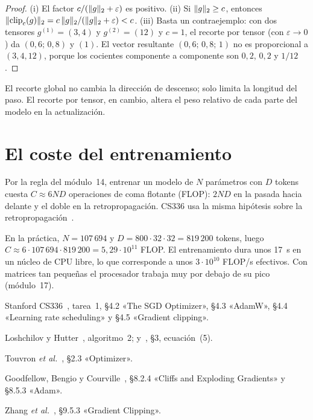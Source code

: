 \begin{proof}
(i) El factor $c/(\lVert g\rVert_2+\varepsilon)$ es positivo. (ii) Si $\lVert g\rVert_2\ge c$, entonces $\lVert\operatorname{clip}_c(g)\rVert_2=c\,\lVert g\rVert_2/(\lVert g\rVert_2+\varepsilon)<c$. (iii) Basta un contraejemplo: con dos tensores $g^{(1)}=(3,4)$ y $g^{(2)}=(12)$ y $c=1$, el recorte por tensor (con $\varepsilon\to 0$) da $(0{,}6;\allowbreak\,0{,}8)$ y $(1)$. El vector resultante $(0{,}6;\allowbreak\,0{,}8;\allowbreak\,1)$ no es proporcional a $(3,4,12)$, porque los cocientes componente a componente son $0{,}2$, $0{,}2$ y $1/12$.
\end{proof}

El recorte global no cambia la dirección de descenso; solo limita la longitud del paso. El recorte por tensor, en cambio, altera el peso relativo de cada parte del modelo en la actualización.

\section{El coste del entrenamiento}

Por la regla del módulo~14, entrenar un modelo de $N$ parámetros con $D$ tokens cuesta $C\approx 6ND$ operaciones de coma flotante (FLOP): $2ND$ en la pasada hacia delante y el doble en la retropropagación. CS336 usa la misma hipótesis sobre la retropropagación~\cite[§4.3, problema \emph{adamw\_accounting}]{cs336}.

\begin{ejemplo}\label{ej:coste}
En la práctica, $N=107\,694$ y $D=800\cdot 32\cdot 32=819\,200$ tokens, luego $C\approx 6\cdot 107\,694\cdot 819\,200=5{,}29\cdot 10^{11}$ FLOP. El entrenamiento dura unos 17~s en un núcleo de CPU libre, lo que corresponde a unos $3\cdot 10^{10}$ FLOP/s efectivos. Con matrices tan pequeñas el procesador trabaja muy por debajo de su pico (módulo~17).
\end{ejemplo}

\begin{lecturas}
\item Stanford CS336~\cite{cs336}, tarea~1, §4.2 «The SGD Optimizer», §4.3 «AdamW», §4.4 «Learning rate scheduling» y §4.5 «Gradient clipping».
\item Loshchilov y Hutter~\cite{adamw}, algoritmo~2; y~\cite{sgdr}, §3, ecuación~(5).
\item Touvron \emph{et al.}~\cite{llama}, §2.3 «Optimizer».
\item Goodfellow, Bengio y Courville~\cite{gbc}, §8.2.4 «Cliffs and Exploding Gradients» y §8.5.3 «Adam».
\item Zhang \emph{et al.}~\cite{d2l}, §9.5.3 «Gradient Clipping».
\end{lecturas}

